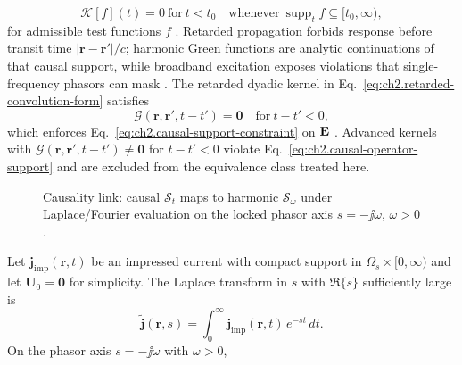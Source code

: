 \begin{equation}
\label{eq:ch2.causal-operator-support}
\mathcal{K}[f](t)=0\ \text{for}\ t<t_0
\quad\text{whenever}\ 
\operatorname{supp}_t f\subseteq[t_0,\infty),
\end{equation}
for admissible test functions \(f\) \cite{stratton1941}. Retarded propagation forbids
response before transit time $|\mathbf{r}-\mathbf{r}'|/c$; harmonic Green functions are
analytic continuations of that causal support, while broadband excitation exposes
violations that single-frequency phasors can mask \cite{sommerfeld1949}.
The retarded dyadic kernel
in Eq.~\eqref{eq:ch2.retarded-convolution-form} satisfies
\begin{equation}
\label{eq:ch2.retarded-kernel-support}
\mathcal{G}(\mathbf{r},\mathbf{r}',t-t')=\mathbf{0}\quad\text{for}\ t-t'<0,
\end{equation}
which enforces Eq.~\eqref{eq:ch2.causal-support-constraint} on \(\mathbf{E}\)
\cite{stratton1941}. Advanced kernels with
\(\mathcal{G}(\mathbf{r},\mathbf{r}',t-t')\neq\mathbf{0}\) for \(t-t'<0\) violate
Eq.~\eqref{eq:ch2.causal-operator-support} and are excluded from the equivalence
class treated here.
\begin{figure}[t]
\centering
{}
\caption{Causality link: causal \(\mathcal{S}_t\) maps to harmonic
\(\mathcal{S}_\omega\) under Laplace/Fourier evaluation on the locked phasor axis
\(s=-\jj\omega\), \(\omega>0\).}
\label{fig:ch2.laplace-resolvent-linkage}
\end{figure}
Let
\(\mathbf{j}_{\mathrm{imp}}(\mathbf{r},t)\) be an impressed current with compact
support in \(\Omega_s\times[0,\infty)\) and let \(\mathbf{U}_0=\mathbf{0}\) for
simplicity. The Laplace transform in \(s\) with \(\Re\{s\}\) sufficiently large is
\begin{equation}
\label{eq:ch2.laplace-source-transform}
\widetilde{\mathbf{j}}(\mathbf{r},s)
=
\int_0^\infty \mathbf{j}_{\mathrm{imp}}(\mathbf{r},t)\,e^{-st}\,dt.
\end{equation}
On the phasor axis \(s=-\jj\omega\) with \(\omega>0\),
